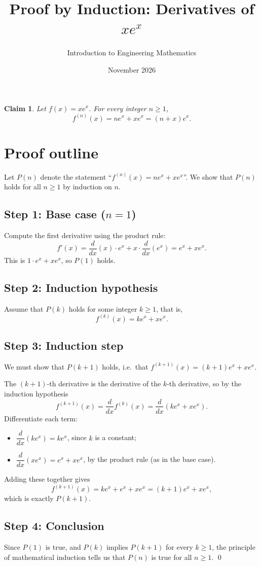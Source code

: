 \documentclass{article}
\title{Proof by Induction: Derivatives of $x e^x$}
\author{Introduction to Engineering Mathematics}
\date{November 2026}
\newtheorem*{claim}{Claim}
\begin{document}
\maketitle

\begin{claim}
  Let $f(x) = x e^x$. For every integer $n \ge 1$,
  \[
    f^{(n)}(x) = n e^x + x e^x = (n + x) e^x.
  \]
\end{claim}

\section*{Proof outline}

Let $P(n)$ denote the statement ``$f^{(n)}(x) = n e^x + x e^x$''.
We show that $P(n)$ holds for all $n \ge 1$ by induction on $n$.

\subsection*{Step 1: Base case ($n = 1$)}

Compute the first derivative using the product rule:
\[
  f'(x) = \frac{d}{dx}(x) \cdot e^x + x \cdot \frac{d}{dx}(e^x)
        = e^x + x e^x.
\]
This is $1 \cdot e^x + x e^x$, so $P(1)$ holds.

\subsection*{Step 2: Induction hypothesis}

Assume that $P(k)$ holds for some integer $k \ge 1$, that is,
\[
  f^{(k)}(x) = k e^x + x e^x.
\]

\subsection*{Step 3: Induction step}

We must show that $P(k + 1)$ holds, i.e.\ that
$f^{(k+1)}(x) = (k + 1) e^x + x e^x$.

The $(k+1)$-th derivative is the derivative of the $k$-th derivative, so by
the induction hypothesis
\[
  f^{(k+1)}(x) = \frac{d}{dx} f^{(k)}(x)
               = \frac{d}{dx} \left( k e^x + x e^x \right).
\]
Differentiate each term:
\begin{itemize}
\item $\dfrac{d}{dx}(k e^x) = k e^x$, since $k$ is a constant;
\item $\dfrac{d}{dx}(x e^x) = e^x + x e^x$, by the product rule (as in the
  base case).
\end{itemize}
Adding these together gives
\[
  f^{(k+1)}(x) = k e^x + e^x + x e^x = (k + 1) e^x + x e^x,
\]
which is exactly $P(k + 1)$.

\subsection*{Step 4: Conclusion}

Since $P(1)$ is true, and $P(k)$ implies $P(k + 1)$ for every $k \ge 1$, the
principle of mathematical induction tells us that $P(n)$ is true for all
$n \ge 1$. \qed
\end{document}
